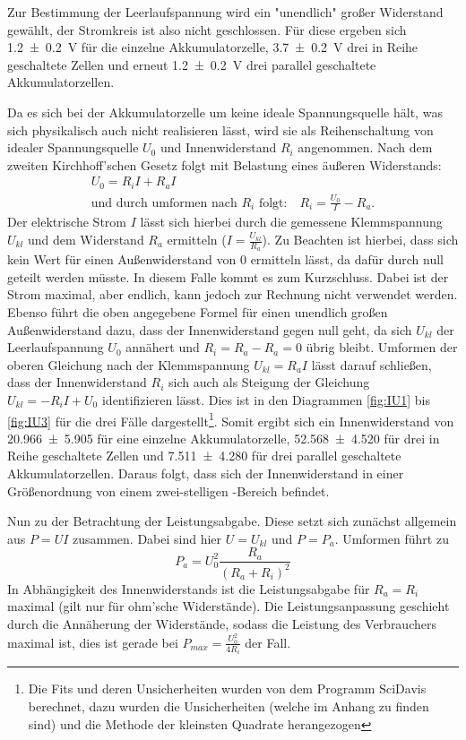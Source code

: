 Zur Bestimmung der Leerlaufspannung wird ein "unendlich" großer Widerstand gewählt, der Stromkreis ist also nicht geschlossen.
Für diese ergeben sich \SI{1,2+-0,2}{V} für die einzelne Akkumulatorzelle, \SI{3,7+-0,2}{V} drei in Reihe geschaltete Zellen und erneut \SI{1,2+-0,2}{V} drei parallel geschaltete Akkumulatorzellen. 

Da es sich bei der Akkumulatorzelle um keine ideale Spannungsquelle hält, was sich physikalisch auch nicht realisieren lässt, wird sie als Reihenschaltung von idealer Spannungsquelle $U_0$ und Innenwiderstand $R_i$ angenommen. 
Nach dem zweiten Kirchhoff'schen Gesetz folgt mit Belastung eines äußeren Widerstands:
\begin{align}
	U_0 = R_i I + R_a I \\
	\text{und durch umformen nach $R_i$ folgt:} \quad R_i = \frac{U_0}{I}-R_a.
\end{align}
Der elektrische Strom $I$ lässt sich hierbei durch die gemessene Klemmspannung $U_{kl}$ und dem Widerstand $R_a$ ermitteln ($I=\frac{U_{kl}}{R_a}$).
Zu Beachten ist hierbei, dass sich kein Wert für einen Außenwiderstand von \SI{0}{\Omega} ermitteln lässt, da dafür durch null geteilt werden müsste.
In diesem Falle kommt es zum Kurzschluss.
Dabei ist der Strom maximal, aber endlich, kann jedoch zur Rechnung nicht verwendet werden.
Ebenso führt die oben angegebene Formel für einen unendlich großen Außenwiderstand dazu, dass der Innenwiderstand gegen null geht, da sich $U_{kl}$ der Leerlaufspannung $U_0$ annähert und $R_i = R_a - R_a = 0$ übrig bleibt.
Umformen der oberen Gleichung nach der Klemmspannung $U_{kl} = R_a I$ lässt darauf schließen, dass der Innenwiderstand $R_i$ sich auch als Steigung der Gleichung $U_{kl} = -R_i I + U_0$ identifizieren lässt. Dies ist in den Diagrammen \ref{fig:IU1} bis \ref{fig:IU3} für die drei Fälle dargestellt\footnote{Die Fits und deren Unsicherheiten wurden von dem Programm SciDavis berechnet, dazu wurden die Unsicherheiten (welche im Anhang zu finden sind) und die Methode der kleinsten Quadrate herangezogen}.
Somit ergibt sich ein Innenwiderstand von \SI{20,966+-5,905}{\Omega} für eine einzelne Akkumulatorzelle, \SI{52,568+-4,520}{\Omega} für drei in Reihe geschaltete Zellen und \SI{7,511+-4,280}{\Omega} für drei parallel geschaltete Akkumulatorzellen. 
Daraus folgt, dass sich der Innenwiderstand in einer Größenordnung von einem zwei-stelligen \si{\Omega}-Bereich befindet. 

Nun zu der Betrachtung der Leistungsabgabe.
Diese setzt sich zunächst allgemein aus $P = UI$ zusammen. 
Dabei sind hier $U = U_{kl}$ und $P=P_a$.
Umformen führt zu
\begin{equation}
	P_a = U_0^2\frac{R_a}{(R_a+R_i)^2}
\end{equation}
In Abhängigkeit des Innenwiderstands ist die Leistungsabgabe für $R_a = R_i$ maximal (gilt nur für ohm'sche Widerstände). 
Die Leistungsanpassung geschieht durch die Annäherung der Widerstände, sodass die Leistung des Verbrauchers maximal ist, dies ist gerade bei $P_{max} = \frac{U_0^2}{4R_i}$ der Fall.

